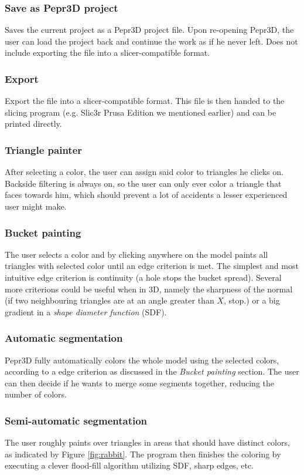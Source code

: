 \subsubsection{Save as Pepr3D project}
Saves the current project as a Pepr3D project file. Upon re-opening Pepr3D, the user can load the project back and continue the work as if he never left. Does not include exporting the file into a slicer-compatible format.

\subsubsection{Export}
Export the file into a slicer-compatible format. This file is then handed to the slicing program (e.g. Slic3r Prusa Edition we mentioned earlier) and can be printed directly.

\subsubsection{Triangle painter}
After selecting a color, the user can assign said color to triangles he clicks on. Backside filtering is always on, so the user can only ever color a triangle that faces towards him, which should prevent a lot of accidents a lesser experienced user might make.

\subsubsection{Bucket painting}
The user selects a color and by clicking anywhere on the model paints all triangles with selected color until an edge criterion is met. The simplest and most intuitive edge criterion is continuity (a hole stops the bucket spread). Several more criterions could be useful when in 3D, namely the sharpness of the normal (if two neighbouring triangles are at an angle greater than $X$, stop.) or a big gradient in a \textit{shape diameter function} (SDF).

\subsubsection{Automatic segmentation}
Pepr3D fully automatically colors the whole model using the selected colors, according to a edge criterion as discussed in the \textit{Bucket painting} section. The user can then decide if he wants to merge some segments together, reducing the number of colors.

\subsubsection{Semi-automatic segmentation}
The user roughly paints over triangles in areas that should have distinct colors, as indicated by Figure \ref{fig:rabbit}. The program then finishes the coloring by executing a clever flood-fill algorithm utilizing SDF, sharp edges, etc. 

